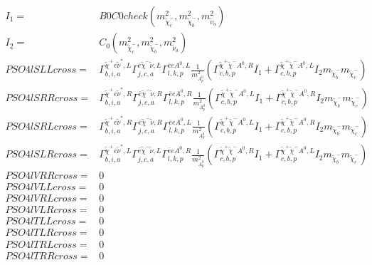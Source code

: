 \documentclass[A4,landscape]{article}
\begin{document}
\begin{align} 
I_1= & B0C0check(m^2_{\tilde{\chi}^-_{{c}}}, m^2_{\tilde{\chi}^-_{{b}}}, m^2_{\tilde{\nu}_{{a}}}) \\ 
I_2= & C_0(m^2_{\tilde{\chi}^-_{{c}}}, m^2_{\tilde{\chi}^-_{{b}}}, m^2_{\tilde{\nu}_{{a}}}) \\ 
  PSO4lSLLcross= &  \Gamma^{\tilde{\chi}^+e \tilde{\nu}^*,L}_{b, i, a} \Gamma^{\bar{e}\tilde{\chi}^- \tilde{\nu} ,L}_{j, c, a} \Gamma^{\bar{e}e A^0 ,L}_{l, k, p} \frac{1}{m^2_{A^0_{{p}}}} (\Gamma^{\tilde{\chi}^+\tilde{\chi}^- A^0 ,R}_{c, b, p} I_1 + \Gamma^{\tilde{\chi}^+\tilde{\chi}^- A^0 ,L}_{c, b, p} I_2 m_{\tilde{\chi}^-_{{b}}} m_{\tilde{\chi}^-_{{c}}}) \\ 
  PSO4lSRRcross= &  \Gamma^{\tilde{\chi}^+e \tilde{\nu}^*,R}_{b, i, a} \Gamma^{\bar{e}\tilde{\chi}^- \tilde{\nu} ,R}_{j, c, a} \Gamma^{\bar{e}e A^0 ,R}_{l, k, p} \frac{1}{m^2_{A^0_{{p}}}} (\Gamma^{\tilde{\chi}^+\tilde{\chi}^- A^0 ,L}_{c, b, p} I_1 + \Gamma^{\tilde{\chi}^+\tilde{\chi}^- A^0 ,R}_{c, b, p} I_2 m_{\tilde{\chi}^-_{{b}}} m_{\tilde{\chi}^-_{{c}}}) \\ 
  PSO4lSRLcross= &  \Gamma^{\tilde{\chi}^+e \tilde{\nu}^*,R}_{b, i, a} \Gamma^{\bar{e}\tilde{\chi}^- \tilde{\nu} ,R}_{j, c, a} \Gamma^{\bar{e}e A^0 ,L}_{l, k, p} \frac{1}{m^2_{A^0_{{p}}}} (\Gamma^{\tilde{\chi}^+\tilde{\chi}^- A^0 ,L}_{c, b, p} I_1 + \Gamma^{\tilde{\chi}^+\tilde{\chi}^- A^0 ,R}_{c, b, p} I_2 m_{\tilde{\chi}^-_{{b}}} m_{\tilde{\chi}^-_{{c}}}) \\ 
  PSO4lSLRcross= &  \Gamma^{\tilde{\chi}^+e \tilde{\nu}^*,L}_{b, i, a} \Gamma^{\bar{e}\tilde{\chi}^- \tilde{\nu} ,L}_{j, c, a} \Gamma^{\bar{e}e A^0 ,R}_{l, k, p} \frac{1}{m^2_{A^0_{{p}}}} (\Gamma^{\tilde{\chi}^+\tilde{\chi}^- A^0 ,R}_{c, b, p} I_1 + \Gamma^{\tilde{\chi}^+\tilde{\chi}^- A^0 ,L}_{c, b, p} I_2 m_{\tilde{\chi}^-_{{b}}} m_{\tilde{\chi}^-_{{c}}}) \\ 
  PSO4lVRRcross= & 0 \\ 
  PSO4lVLLcross= & 0 \\ 
  PSO4lVRLcross= & 0 \\ 
  PSO4lVLRcross= & 0 \\ 
  PSO4lTLLcross= & 0 \\ 
  PSO4lTLRcross= & 0 \\ 
  PSO4lTRLcross= & 0 \\ 
  PSO4lTRRcross= & 0 \\ 
\end{align} 
\end{document}
